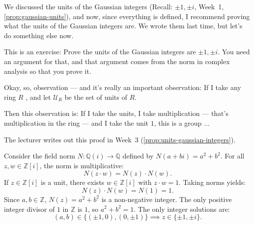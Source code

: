 \begin{speech}[00:28:16 - 00:29:52]
We discussed the units of the Gaussian integers (Recall: $\pm 1, \pm i$, Week~1, \cref{prop:gaussian-units}), and now, since everything is defined, I recommend proving what the units of the Gaussian integers are. We wrote them last time, but let's do something else now. 

This is an exercise: Prove the units of the Gaussian integers are $\pm 1, \pm i$. You need an argument for that, and that argument comes from the norm in complex analysis so that you prove it.

Okay, so, observation  --- and it's really an important observation: If I take any ring $R$ , and let $\mathcal{U}_R$  be the set of units of $R$.

Then this observation is: If I take the units, I take multiplication --- that's multiplication in the ring --- and I take the unit $1$, this is a group ...
\end{speech}

\begin{content}

The lecturer writes out this proof in Week~3 (\cref{prop:units-gaussian-integers}).

\begin{steps}
Consider the field norm $N \colon \mathbb{Q}(i) \to \mathbb{Q}$ defined by $N(a + bi) = a^2 + b^2$. For all $z, w \in \mathbb{Z}[i]$, the norm is multiplicative:
\[
N(z \cdot w) = N(z) \cdot N(w).
\]
If $z \in \mathbb{Z}[i]$ is a unit, there exists $w \in \mathbb{Z}[i]$ with $z \cdot w = 1$. Taking norms yields:
\[
N(z) \cdot N(w) = N(1) = 1.
\]
Since $a, b \in \mathbb{Z}$, $N(z) = a^2 + b^2$ is a non-negative integer. The only positive integer divisor of $1$ in $\mathbb{Z}$ is $1$, so $a^2 + b^2 = 1$. The only integer solutions are:
\[
(a, b) \in \{(\pm 1, 0), (0, \pm 1)\} \implies z \in \{\pm 1, \pm i\}.
\]
\end{steps}
\end{content}

